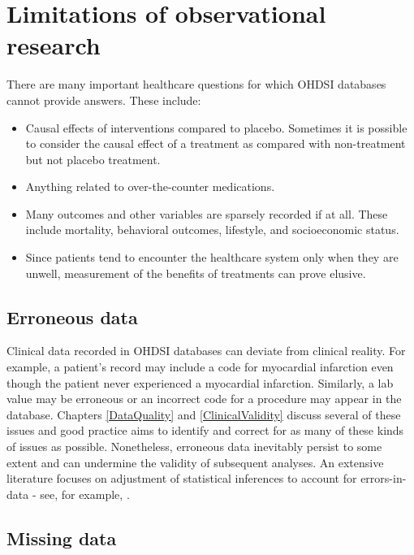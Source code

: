 \documentclass[11pt]{book}
\providecommand{\tightlist}{%
  \setlength{\itemsep}{0pt}\setlength{\parskip}{0pt}}
\theoremstyle{definition}
\theoremstyle{definition}
\theoremstyle{definition}
\theoremstyle{remark}
\begin{document}
\hypertarget{limitations-of-observational-research}{%
\section{Limitations of observational research}\label{limitations-of-observational-research}}

There are many important healthcare questions for which OHDSI databases cannot provide answers. These include:

\begin{itemize}
\tightlist
\item
  Causal effects of interventions compared to placebo. Sometimes it is possible to consider the causal effect of a treatment as compared with non-treatment but not placebo treatment.
\item
  Anything related to over-the-counter medications.
\item
  Many outcomes and other variables are sparsely recorded if at all. These include mortality, behavioral outcomes, lifestyle, and socioeconomic status.
\item
  Since patients tend to encounter the healthcare system only when they are unwell, measurement of the benefits of treatments can prove elusive.
\end{itemize}

\hypertarget{erroneous-data}{%
\subsection{Erroneous data}\label{erroneous-data}}

Clinical data recorded in OHDSI databases can deviate from clinical reality. For example, a patient's record may include a code for myocardial infarction even though the patient never experienced a myocardial infarction. Similarly, a lab value may be erroneous or an incorrect code for a procedure may appear in the database. Chapters \ref{DataQuality} and \ref{ClinicalValidity} discuss several of these issues and good practice aims to identify and correct for as many of these kinds of issues as possible. Nonetheless, erroneous data inevitably persist to some extent and can undermine the validity of subsequent analyses. An extensive literature focuses on adjustment of statistical inferences to account for errors-in-data - see, for example, \citet{fuller2009measurement}.

\hypertarget{missing-data}{%
\subsection{Missing data}\label{missing-data}}
\end{document}
